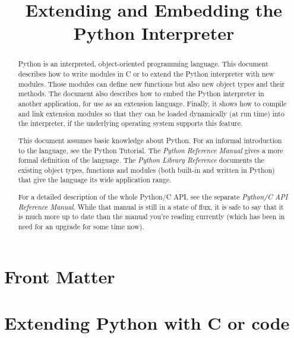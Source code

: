 \documentclass{manual}
\title{Extending and Embedding the Python Interpreter}
\begin{document}
\maketitle

\ifhtml
\chapter*{Front Matter\label{front}}
\fi



\begin{abstract}

\noindent
Python is an interpreted, object-oriented programming language.  This
document describes how to write modules in C or \Cpp{} to extend the
Python interpreter with new modules.  Those modules can define new
functions but also new object types and their methods.  The document
also describes how to embed the Python interpreter in another
application, for use as an extension language.  Finally, it shows how
to compile and link extension modules so that they can be loaded
dynamically (at run time) into the interpreter, if the underlying
operating system supports this feature.

This document assumes basic knowledge about Python.  For an informal
introduction to the language, see the Python Tutorial.  The \emph{Python
Reference Manual} gives a more formal definition of the language.  The
\emph{Python Library Reference} documents the existing object types,
functions and modules (both built-in and written in Python) that give
the language its wide application range.

For a detailed description of the whole Python/C API, see the separate
\emph{Python/C API Reference Manual}.   While that
manual is still in a state of flux, it is safe to say that it is much
more up to date than the manual you're reading currently (which has
been in need for an upgrade for some time now).


\end{abstract}

\tableofcontents


\chapter{Extending Python with C or \Cpp{} code}


\label{intro}
\end{document}

